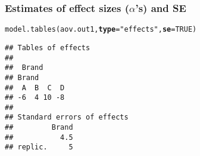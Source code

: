 \documentclass[color=usenames,dvipsnames]{beamer}\usepackage[]{graphicx}\usepackage[]{color}
\makeatletter
\newcommand{\hlnum}[1]{\textcolor[rgb]{0.69,0.494,0}{#1}}%
\newcommand{\hlstr}[1]{\textcolor[rgb]{0.749,0.012,0.012}{#1}}%
\newcommand{\hlstd}[1]{\textcolor[rgb]{0,0,0}{#1}}%
\newcommand{\hlkwc}[1]{\textcolor[rgb]{0,0,0}{\textbf{#1}}}%
\newcommand{\hlkwd}[1]{\textcolor[rgb]{0.004,0.004,0.506}{#1}}%
\newenvironment{kframe}{%
 \def\at@end@of@kframe{}%
 \ifinner\ifhmode%
  \def\at@end@of@kframe{\end{minipage}}%
  \begin{minipage}{\columnwidth}%
 \fi\fi%
 \def\FrameCommand##1{\hskip\@totalleftmargin \hskip-\fboxsep
 \colorbox{shadecolor}{##1}\hskip-\fboxsep
     \hskip-\linewidth \hskip-\@totalleftmargin \hskip\columnwidth}%
 \MakeFramed {\advance\hsize-\width
   \@totalleftmargin\z@ \linewidth\hsize
   \@setminipage}}%
 {\par\unskip\endMakeFramed%
 \at@end@of@kframe}
\newenvironment{knitrout}{}{} %
\makeatother
\begin{document}
\begin{frame}[fragile]
  \frametitle{Estimates of effect sizes ($\alpha$'s) and SE}
\begin{knitrout}
\color{fgcolor}\begin{kframe}
\begin{alltt}
\hlkwd{model.tables}\hlstd{(aov.out1,} \hlkwc{type}\hlstd{=}\hlstr{"effects"}\hlstd{,} \hlkwc{se}\hlstd{=}\hlnum{TRUE}\hlstd{)}
\end{alltt}
\begin{verbatim}
## Tables of effects
## 
##  Brand 
## Brand
##  A  B  C  D 
## -6  4 10 -8 
## 
## Standard errors of effects
##         Brand
##           4.5
## replic.     5
\end{verbatim}
\end{kframe}
\end{knitrout}
\end{frame}
\end{document}
